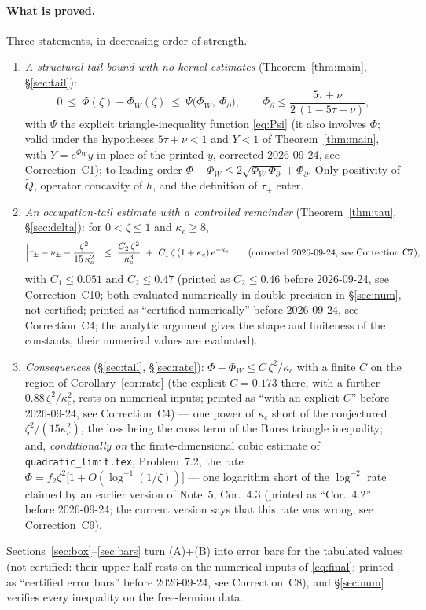 \documentclass[11pt]{article}
\begin{document}
\paragraph{What is proved.}  Three statements, in decreasing order of strength.
\begin{enumerate}[label=(\Alph*),leftmargin=2.2em]
\item \emph{A structural tail bound with no kernel estimates} (Theorem~\ref{thm:main}, \S\ref{sec:tail}):
 \[
  0\ \le\ \Phi(\zeta)-\Phi_W(\zeta)\ \le\ \Psi\bigl(\Phi_W,\ \Phi_\partial\bigr),\qquad
  \Phi_\partial\le\frac{5\tau+\nu}{2\,(1-5\tau-\nu)},
 \]
 with $\Psi$ the explicit triangle-inequality function \eqref{eq:Psi} (it also involves $\Phi$; valid under the hypotheses $5\tau+\nu<1$ and $Y<1$ of Theorem~\ref{thm:main}, with $Y=e^{\Phi_W}y$ in place of the printed $y$, corrected 2026-09-24, see Correction~C1); to leading order
 $\Phi-\Phi_W\le2\sqrt{\Phi_W\,\Phi_\partial}+\Phi_\partial$.  Only positivity of $\widetilde Q$,
 operator concavity of $h$, and the definition of $\tau_\pm$ enter.
\item \emph{An occupation-tail estimate with a controlled remainder}
 (Theorem~\ref{thm:tau}, \S\ref{sec:delta}): for $0<\zeta\le1$ and $\kappa_c\ge8$,
 \[
  \Bigl|\tau_\pm-\nu_\pm-\frac{\zeta^2}{15\,\kappa_c^{2}}\Bigr|
  \ \le\ \frac{C_2\,\zeta^{2}}{\kappa_c^{3}}\ +\ C_1\,\zeta\,(1+\kappa_c)\,e^{-\kappa_c}\qquad(\text{corrected 2026-09-24, see Correction~C7}),
 \]
 with $C_1\le0.051$ and $C_2\le0.47$ (printed as $C_2\le0.46$ before 2026-09-24, see Correction~C10; both evaluated numerically in double precision in \S\ref{sec:num}, not certified; printed as ``certified numerically'' before 2026-09-24, see Correction~C4; the analytic
 argument gives the shape and finiteness of the constants, their numerical values are evaluated).
\item \emph{Consequences} (\S\ref{sec:tail}, \S\ref{sec:rate}): $\Phi-\Phi_W\le C\,\zeta^2/\kappa_c$
 with a finite $C$ on the region of Corollary~\ref{cor:rate} (the explicit $C=0.173$ there, with a further $0.88\,\zeta^2/\kappa_c^2$, rests on numerical inputs; printed as ``with an explicit $C$'' before 2026-09-24, see Correction~C4) --- one power of $\kappa_c$ short of the conjectured
 $\zeta^2/(15\kappa_c^2)$, the loss being the cross term of the Bures triangle inequality; and,
 \emph{conditionally on} the finite-dimensional cubic estimate of \texttt{quadratic\_limit.tex},
 Problem~7.2, the rate $\Phi=f_2\zeta^2\bigl[1+O(\log^{-1}(1/\zeta))\bigr]$ --- one logarithm short of
 the $\log^{-2}$ rate claimed by an earlier version of Note~5, Cor.~4.3 (printed as ``Cor.~4.2'' before 2026-09-24; the current version says that this rate was wrong, see Correction~C9).
\end{enumerate}
Sections~\ref{sec:box}--\ref{sec:bars} turn (A)+(B) into error bars for the tabulated values (not certified: their upper half rests on the numerical inputs of \eqref{eq:final}; printed as ``certified error bars'' before 2026-09-24, see Correction~C8),
and \S\ref{sec:num} verifies every inequality on the free-fermion data.
\end{document}
